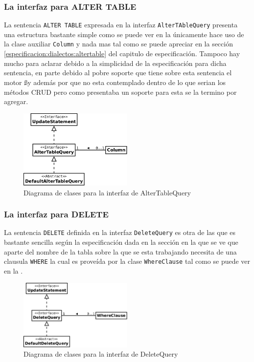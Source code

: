 \subsubsection{La interfaz para ALTER TABLE}
La sentencia \verb=ALTER TABLE= expresada en la interfaz \verb=AlterTAbleQuery= presenta una estructura bastante simple como se puede ver en la  únicamente hace uso de la clase auxiliar \verb=Column= y nada mas tal como se puede apreciar en la sección \ref{especificacion:dialectos:altertable} del capitulo de especificación. Tampoco hay mucho para aclarar debido a la simplicidad de la especificación para dicha sentencia, en parte debido al pobre soporte que tiene sobre esta sentencia el motor \ss y además por que no esta contemplado dentro de lo que serian los métodos CRUD pero como \cc presentaba un soporte para esta se la termino por agregar.
\begin{figure}
  \centering
    \includegraphics[width=0.5\textwidth]{figuras/jdbgm-dc-altertable.png}
  \caption{Diagrama de clases para la interfaz de AlterTableQuery}
  \label{fig:dc-altertabletquery}
\end{figure}

\subsubsection{La interfaz para DELETE}
La sentencia \verb=DELETE= definida en la interfaz \verb=DeleteQuery= es otra de las que es bastante sencilla según la especificación dada en la sección  en la que se ve que aparte del nombre de la tabla sobre la que se esta trabajando necesita de una clausula \verb=WHERE= la cual es proveída por la clase \verb=WhereClause= tal como se puede ver en la .

\begin{figure}
  \centering
    \includegraphics[width=0.5\textwidth]{figuras/jdbgm-dc-delete.png}
  \caption{Diagrama de clases para la interfaz de DeleteQuery}
  \label{fig:dc-deletequery}
\end{figure}

